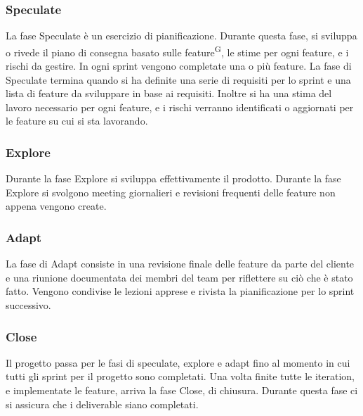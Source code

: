     \subsubsection{Speculate}\label{sec:modello_sviluppo:agile:speculate}
    La fase Speculate è un esercizio di pianificazione. Durante questa fase, si sviluppa o rivede il piano di consegna basato sulle feature\textsuperscript{G}, le stime per ogni feature, e i rischi da gestire. In ogni sprint vengono completate una o più feature. %
    La fase di Speculate termina quando si ha definite una serie di requisiti per lo sprint e una lista di feature da sviluppare in base ai requisiti. Inoltre si ha una stima del lavoro necessario per ogni feature, e i rischi verranno identificati o aggiornati per le feature su cui si sta lavorando.
    \subsubsection{Explore}\label{sec:modello_sviluppo:agile:explore}
    Durante la fase Explore si sviluppa effettivamente il prodotto. Durante la fase Explore si svolgono meeting giornalieri e revisioni frequenti delle feature non appena vengono create.
    \subsubsection{Adapt}\label{sec:modello_sviluppo:agile:adapt}
    La fase di Adapt consiste in una revisione finale delle feature da parte del cliente e una riunione documentata dei membri del team per riflettere su ciò che è stato fatto. Vengono condivise le lezioni apprese e rivista la pianificazione per lo sprint successivo.
    \subsubsection{Close}\label{sec:modello_sviluppo:agile:close}
    Il progetto passa per le fasi di speculate, explore e adapt fino al momento in cui tutti gli sprint per il progetto sono completati. Una volta finite tutte le iteration, e implementate le feature, arriva la fase Close, di chiusura.
    Durante questa fase ci si assicura che i deliverable siano completati.

